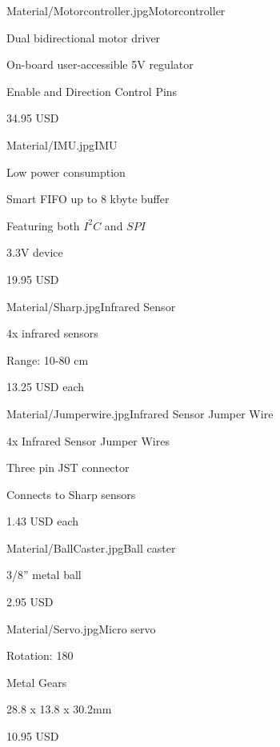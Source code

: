 \newpage
{}
\begin{material}{Material/Motorcontroller.jpg}{Motorcontroller}
\item Dual bidirectional motor driver
\item On-board user-accessible 5V regulator 
\item Enable and Direction Control Pins
\item 34.95 USD
\end{material}

\begin{material}{Material/IMU.jpg}{IMU}
\item Low power consumption
\item Smart FIFO up to 8 kbyte buffer
\item Featuring both $I^2C$ and $SPI$
\item 3.3V device
\item 19.95 USD
\end{material}

\begin{material}{Material/Sharp.jpg}{Infrared Sensor}
\item 4x infrared sensors
\item Range: 10-80 cm
\item 13.25 USD each
\end{material}

\newpage
{}
\begin{material}{Material/Jumperwire.jpg}{Infrared Sensor Jumper Wire}
\item 4x Infrared Sensor Jumper Wires
\item Three pin JST connector
\item Connects to Sharp sensors
\item 1.43 USD each
\end{material}

\begin{material}{Material/BallCaster.jpg}{Ball caster}
\item 3/8'' metal ball
\item 2.95 USD
\end{material}

\begin{material}{Material/Servo.jpg}{Micro servo}
\item Rotation: 180\degree
\item Metal Gears
\item 28.8 x 13.8 x 30.2mm
\item 10.95 USD
\end{material}

